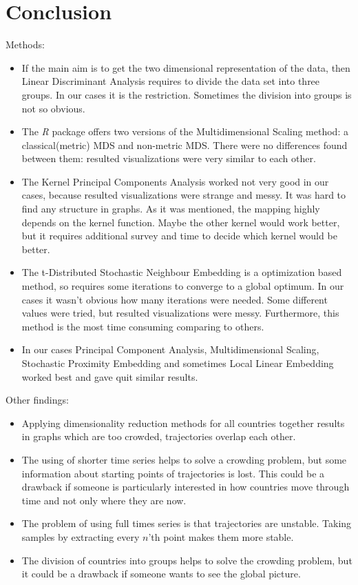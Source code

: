 \documentclass[a4paper]{article}
\begin{document}
\section{Conclusion}
Methods:
\begin{itemize}
  \item If the main aim is to get the two dimensional representation of the data, then Linear Discriminant Analysis requires to divide the data set into three groups. In our cases it is the restriction. Sometimes the division into groups is not so obvious.
  \item The \textit{R} package offers two versions of the Multidimensional Scaling method: a classical(metric) MDS and non-metric MDS. There were no differences found between them: resulted visualizations were very similar to each other.
  \item The Kernel Principal Components Analysis worked not very good in our cases, because resulted visualizations were strange and messy. It was hard to find any structure in graphs. As it was mentioned, the mapping highly depends on the kernel function. Maybe the other kernel would work better, but it requires additional survey and time to decide which kernel would be better. 
  \item The t-Distributed Stochastic Neighbour Embedding is a optimization based method, so requires some iterations to converge to a global optimum. In our cases it wasn't obvious how many iterations were needed. Some different values were tried, but resulted visualizations were messy. Furthermore, this method is the most time consuming comparing to others.
  \item In our cases Principal Component Analysis, Multidimensional Scaling, Stochastic Proximity Embedding and sometimes Local Linear Embedding worked best and gave quit similar results.  
\end{itemize}

Other findings:
\begin{itemize}
  \item Applying dimensionality reduction methods for all countries together results in graphs which are too crowded, trajectories overlap each other.
  \item The using of shorter time series helps to solve a crowding problem, but some information about starting points of trajectories is lost. This could be a drawback if someone is particularly interested in how countries move through time and not only where they are now. 
  \item The problem of using full times series is that trajectories are unstable. Taking samples by extracting every $n$'th point
  makes them more stable.
  \item The division of countries into groups helps to solve the crowding problem, but it could be a drawback if someone wants to see the global picture.
\end{itemize}
\end{document}
